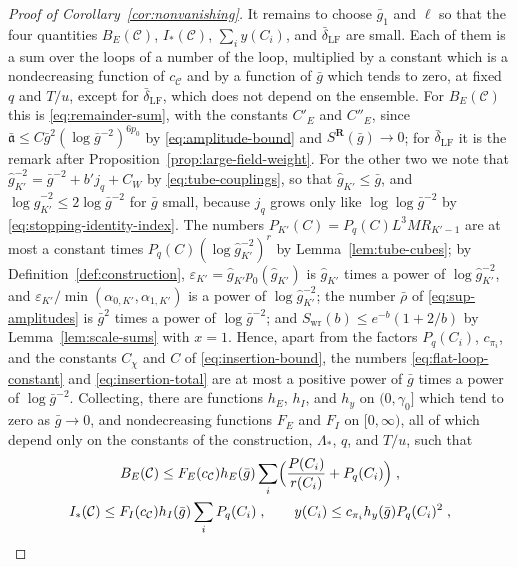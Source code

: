 \documentclass[11pt]{preprint}
\numberwithin{equation}{section}
\theoremstyle{definition}
\theoremstyle{remark}
\theoremstyle{plain}
\begin{document}
\begin{proof}[Proof of Corollary~\ref{cor:nonvanishing}]
It remains to choose $\bar g_1$ and $\ell$ so that the four quantities $B_E(\mathcal C)$, $I_*(\mathcal C)$, $\sum_iy(C_i)$, and $\bar\delta_{\mathrm{LF}}$ are small. Each of them is a sum over the loops of a number of the loop, multiplied by a constant which is a nondecreasing function of $c_{\mathcal C}$ and by a function of $\bar g$ which tends to zero, at fixed $q$ and $T/u$, except for $\bar\delta_{\mathrm{LF}}$, which does not depend on the ensemble. For $B_E(\mathcal C)$ this is \eqref{eq:remainder-sum}, with the constants $C'_E$ and $C''_E$, since $\bar{\mathfrak a} \leq C\bar g^2(\log\bar g^{-2})^{6p_0}$ by \eqref{eq:amplitude-bound} and $S^{\mathbf R}(\bar g) \to 0$; for $\bar\delta_{\mathrm{LF}}$ it is the remark after Proposition~\ref{prop:large-field-weight}. For the other two we note that $\hat g_{K'}^{-2} = \bar g^{-2} + b'j_q + C_W$ by \eqref{eq:tube-couplings}, so that $\hat g_{K'} \leq \bar g$, and $\log\hat g_{K'}^{-2} \leq 2\log\bar g^{-2}$ for $\bar g$ small, because $j_q$ grows only like $\log\log\bar g^{-2}$ by \eqref{eq:stopping-identity-index}. The numbers $P_{K'}(C) = P_q(C)L^3MR_{K'-1}$ are at most a constant times $P_q(C)(\log\hat g_{K'}^{-2})^r$ by Lemma~\ref{lem:tube-cubes}; by Definition~\ref{def:construction}, $\varepsilon_{K'} = \hat g_{K'}p_0(\hat g_{K'})$ is $\hat g_{K'}$ times a power of $\log\hat g_{K'}^{-2}$, and $\varepsilon_{K'}/\min(\alpha_{0,K'}, \alpha_{1,K'})$ is a power of $\log\hat g_{K'}^{-2}$; the number $\bar\rho$ of \eqref{eq:sup-amplitudes} is $\bar g^2$ times a power of $\log\bar g^{-2}$; and $S_{\mathrm{wr}}(b) \leq e^{-b}(1 + 2/b)$ by Lemma~\ref{lem:scale-sums} with $x = 1$. Hence, apart from the factors $P_q(C_i)$, $c_{\pi_i}$, and the constants $C_\chi$ and $C$ of \eqref{eq:insertion-bound}, the numbers \eqref{eq:flat-loop-constant} and \eqref{eq:insertion-total} are at most a positive power of $\bar g$ times a power of $\log\bar g^{-2}$. Collecting, there are functions $h_E$, $h_I$, and $h_y$ on $(0, \gamma_0]$ which tend to zero as $\bar g \to 0$, and nondecreasing functions $F_E$ and $F_I$ on $[0, \infty)$, all of which depend only on the constants of the construction, $\Lambda_*$, $q$, and $T/u$, such that
\begin{equation}\label{eq:nonvanishing-quantities}
\begin{gathered}
    B_E(\mathcal C) \leq F_E(c_{\mathcal C})h_E(\bar g)\sum_i\Bigl(\frac{P(C_i)}{r(C_i)} + P_q(C_i)\Bigr)\;,\\
    I_*(\mathcal C) \leq F_I(c_{\mathcal C})h_I(\bar g)\sum_iP_q(C_i)\;,
    \qquad
    y(C_i) \leq c_{\pi_i}h_y(\bar g)P_q(C_i)^2\;,

\end{gathered}
\end{equation}
\end{proof}
\end{document}

